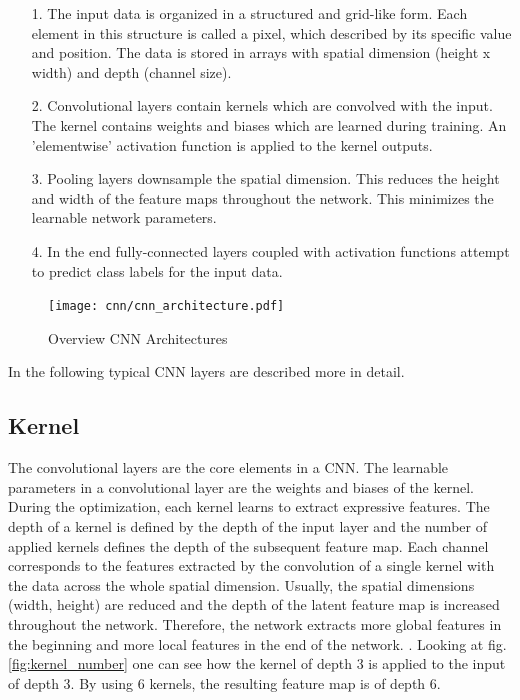 \begin{itemize}
    \item [1.] The input data is organized in a structured and grid-like form. Each element in this structure is called a pixel, which described by its specific value and position. The data is stored in arrays with spatial dimension (height x width) and depth (channel size).
    
    \item [2.] Convolutional layers contain kernels which are convolved with the input. The kernel contains weights and biases which are learned during training. An 'elementwise' activation function is applied to the kernel outputs.
    
    \item [3.]  Pooling layers downsample the spatial dimension. This reduces the height and width of the feature maps throughout the network. This minimizes the learnable network parameters.
    
    \item [4.] In the end fully-connected layers coupled with activation functions attempt to predict class labels for the input data.
\end{itemize}

\begin{figure}[H]
  \centering
  \texttt{[image: cnn/cnn\_architecture.pdf]}
  \caption {Overview CNN Architectures \cite{OShea2015}}
  \label{fig:CNN_overview}
\end{figure}

In the following typical CNN layers are described more in detail. 

\subsection{Kernel}
The convolutional layers are the core elements in a CNN. The learnable parameters in a convolutional layer are the weights and biases of the kernel. During the optimization, each kernel learns to extract expressive features. The depth of a kernel is defined by the depth of the input layer and the number of applied kernels defines the depth of the subsequent feature map. Each channel corresponds to the features extracted by the convolution of a single kernel with the data across the whole spatial dimension. Usually, the spatial dimensions (width, height) are reduced and the depth of the latent feature map is increased throughout the network. Therefore, the network extracts more global features in the beginning and more local features in the end of the network.  \cite{OShea2015}. Looking at fig. \ref{fig:kernel_number} one can see how the kernel of depth 3 is applied to the input of depth 3. By using 6 kernels, the resulting feature map is of depth 6.


